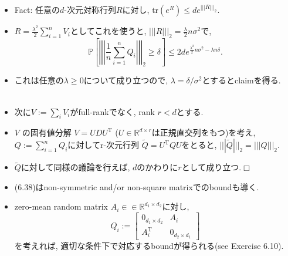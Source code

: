\documentclass[unicode,aspectratio=169,11pt]{beamer}
\def\qed{\hfill $\Box$}
\newcommand{\bb}{\mathbb}
\newcommand{\tr}{\mathrm{T}}
\newcommand{\trace}{\mathrm{tr}}
\begin{document}
\begin{frame}{}{}
  \begin{itemize}
    \item Fact: 任意の$d$-次元対称行列$R$に対し, $\trace(e^R) \le de^{|||R|||_2}$.
    \item $R = \frac{\lambda^2}{2}\sum_{i=1}^n V_i$としてこれを使うと, $||| R|||_2 = \frac{\lambda}{2}n\sigma^2$で, 
          \[
            \mathbb{P}\left[\left|\left|\left|\frac{1}{n} \sum_{i=1}^{n} Q_{i}\right|\right|\right|_{2} \geq \delta\right]
            \leq 2 d e^{\frac{\lambda^{2}}{2} n \sigma^{2}-\lambda n \delta}.
          \]
    \item これは任意の$\lambda \ge 0$について成り立つので, $\lambda = \delta/\sigma^2$とするとclaimを得る.\\　\\
    \item 次に$V := \sum_i V_i$がfull-rankでなく, rank $r < d$とする.
    \item $V$ の固有値分解 $V = UDU^\tr$ ($U \in \bb{R}^{d \times r}$は正規直交列をもつ)を考え,
          $Q := \sum_{i=1}^n Q_i$に対してr-次元行列 $\widetilde{Q} = U^\tr Q U$をとると,
          $||| \widetilde{Q} |||_2 = |||Q|||_2$.
    \item $\widetilde{Q}$に対して同様の議論を行えば, $d$のかわりに$r$として成り立つ.\qed
  \end{itemize}
\end{frame}

\begin{frame}
  \begin{itemize}
    \item (6.38)はnon-symmetric and/or non-square matrixでのboundも導く.
    \item zero-mean random matrix $A_i \in \in \bb{R}^{d_1 \times d_2}$に対し,
          \[ 
            Q_i := \begin{bmatrix}
              0_{d_1 \times d_2} & A_i \\
              A_i^\tr & 0_{d_2 \times d_1}
            \end{bmatrix}
          \]
          を考えれば, 適切な条件下で対応するboundが得られる(see Exercise 6.10).
  \end{itemize}
\end{frame}
\end{document}
